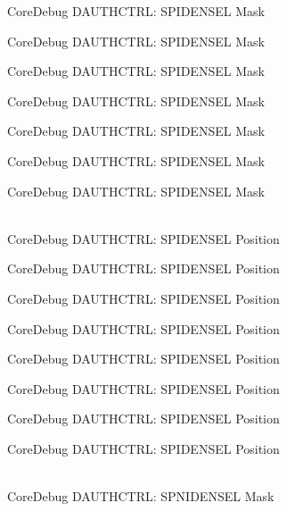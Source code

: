 \begin{DoxyRefList}
\label{deprecated__deprecated000146}%
%
Core\+Debug DAUTHCTRL:\+ SPIDENSEL Mask 

\label{deprecated__deprecated000222}%
%
Core\+Debug DAUTHCTRL:\+ SPIDENSEL Mask 

\label{deprecated__deprecated000285}%
%
Core\+Debug DAUTHCTRL:\+ SPIDENSEL Mask 

\label{deprecated__deprecated000364}%
%
Core\+Debug DAUTHCTRL:\+ SPIDENSEL Mask 

\label{deprecated__deprecated000440}%
%
Core\+Debug DAUTHCTRL:\+ SPIDENSEL Mask 

\label{deprecated__deprecated000543}%
%
Core\+Debug DAUTHCTRL:\+ SPIDENSEL Mask 

\label{deprecated__deprecated000645}%
%
Core\+Debug DAUTHCTRL:\+ SPIDENSEL Mask  
\item[{\parbox[t]{\linewidth}{Global \doxylink{group__CMSIS__SCB_ga587610b7ac18292de47bf9d675b0b88c}{Core\+Debug\+\_\+\+DAUTHCTRL\+\_\+\+SPIDENSEL\+\_\+\+Pos} }}]\hfill \\
\label{deprecated__deprecated000091}%
%
Core\+Debug DAUTHCTRL:\+ SPIDENSEL Position 

\label{deprecated__deprecated000145}%
%
Core\+Debug DAUTHCTRL:\+ SPIDENSEL Position 

\label{deprecated__deprecated000221}%
%
Core\+Debug DAUTHCTRL:\+ SPIDENSEL Position 

\label{deprecated__deprecated000284}%
%
Core\+Debug DAUTHCTRL:\+ SPIDENSEL Position 

\label{deprecated__deprecated000363}%
%
Core\+Debug DAUTHCTRL:\+ SPIDENSEL Position 

\label{deprecated__deprecated000439}%
%
Core\+Debug DAUTHCTRL:\+ SPIDENSEL Position 

\label{deprecated__deprecated000542}%
%
Core\+Debug DAUTHCTRL:\+ SPIDENSEL Position 

\label{deprecated__deprecated000644}%
%
Core\+Debug DAUTHCTRL:\+ SPIDENSEL Position  
\item[{\parbox[t]{\linewidth}{Global \doxylink{group__CMSIS__SCB_gaabb5d6c750c9ec50254134ece2111dcd}{Core\+Debug\+\_\+\+DAUTHCTRL\+\_\+\+SPNIDENSEL\+\_\+\+Msk} }}]\hfill \\
\label{deprecated__deprecated000088}%
%
Core\+Debug DAUTHCTRL:\+ SPNIDENSEL Mask 


\end{DoxyRefList}
